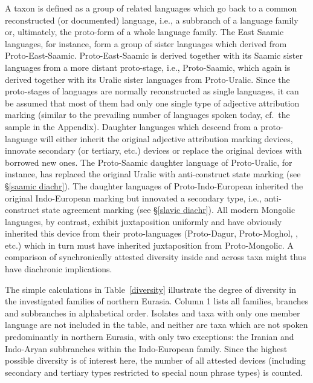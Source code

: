 A taxon is defined as a group of related languages which go back to a common reconstructed (or documented) language, i.e., a subbranch of a language family or, ultimately, the proto-form of a whole language family. The East Saamic languages, for instance, form a group of sister languages which derived from Proto\hyp{}East-Saamic. Proto\hyp{}East-Saamic is derived together with its Saamic sister languages from a more distant proto-stage, i.e., Proto\hyp{}Saamic, which again is derived together with its Uralic sister languages from Proto\hyp{}Uralic. Since the proto-stages of languages are normally reconstructed as single languages, it can be assumed that most of them had only one single type of adjective attribution marking (similar to the prevailing number of languages spoken today, cf.~the sample in the Appendix). Daughter languages which descend from a proto-language will either inherit the original adjective attribution marking devices, innovate secondary (or tertiary, etc.) devices or replace the original devices with borrowed new ones. The Proto\hyp{}Saamic daughter language of Proto\hyp{}Uralic, for instance, has replaced the original Uralic  with anti\hyp{}construct state marking (see \S\ref{saamic diachr}). The  daughter languages of Proto\hyp{}Indo-European inherited the original Indo-European  marking but innovated a secondary type, i.e., anti\hyp{}construct state agreement marking (see \S\ref{slavic diachr}). All modern Mongolic languages, by contrast, exhibit juxtaposition uniformly and have obviously inherited this device from their proto-languages (Proto\hyp{}Dagur, Proto\hyp{}Moghol, , etc.) which in turn must have inherited juxtaposition from Proto\hyp{}Mongolic. A comparison of synchronically attested diversity inside and across taxa might thus have diachronic implications.

The simple calculations in Table~\ref{diversity} illustrate the degree of diversity in the investigated families of northern Eurasia. Column 1 lists all families, branches and subbranches in alphabetical order. Isolates and taxa with only one member language are not included in the table, and neither are taxa which are not spoken predominantly in northern Eurasia, with only two exceptions: the Iranian and Indo-Aryan subbranches within the Indo-European family. Since the highest possible diversity is of interest here, the number of all attested devices (including secondary and tertiary types restricted to special noun phrase types) is counted. 

